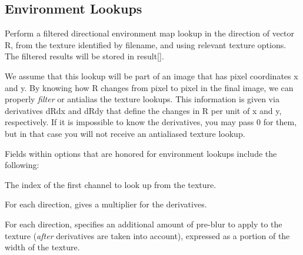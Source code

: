 \subsection{Environment Lookups}
\label{sec:texturesys:api:environment}


Perform a filtered directional environment map lookup in the direction
of vector {\cf R}, from the texture identified by {\cf filename}, and
using relevant texture {\cf options}.  The filtered results will be
stored in {\cf result[]}.

We assume that this lookup will be part of an image that has pixel
coordinates {\cf x} and {\cf y}.  By knowing how {\cf R} changes from
pixel to pixel in the final image, we can properly \emph{filter} or
antialias the texture lookups.  This information is given via
derivatives {\cf dRdx} and {\cf dRdy} that define the changes in {\cf R}
per unit of {\cf x} and {\cf y}, respectively.  If it is impossible to
know the derivatives, you may pass 0 for them, but in that case you will
not receive an antialiased texture lookup.

Fields within {\cf options} that are honored for environment lookups
include the following:

\vspace{-12pt}
\vspace{10pt}
The index of the first channel to look up from the texture.
\apiend

\vspace{-24pt}
\vspace{10pt}
For each direction, gives a multiplier for the derivatives.
\apiend

\vspace{-24pt}
\vspace{10pt}
For each direction, specifies an additional amount of pre-blur to apply
to the texture (\emph{after} derivatives are taken into account),
expressed as a portion of the width of the texture.
\apiend

